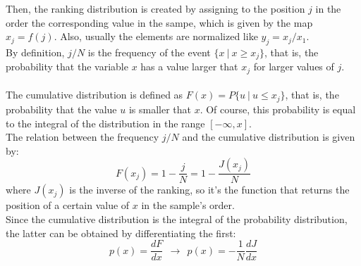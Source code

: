 Then, the ranking distribution is created by assigning to the position $j$ in the order the corresponding value in the sampe, which is given by the map $x_j = f(j)$. Also, usually the elements are normalized like $y_j = x_j/x_1$. \\ 
By definition, $j/N$ is the frequency of the event $\{x \ | \ x \geq x_j \}$, that is, the probability that the variable $x$ has a value larger that $x_j$ for larger values of $j$. \\ \\
The cumulative distribution is defined as $F(x) = P\{u \ | \ u \leq x_j\}$, that is, the probability that the value $u$ is smaller that $x$. Of course, this probability is equal to the integral of the distribution in the range $[-\infty,x]$. \\
The relation between the frequency $j/N$ and the cumulative distribution is given by:
$$
	F(x_j) = 1 - \frac{j}{N} = 1 - \frac{J(x_j)}{N}
$$
where $J(x_j)$ is the inverse of the ranking, so it's the function that returns the position of a certain value of $x$ in the sample's order. \\
Since the cumulative distribution is the integral of the probability distribution, the latter can be obtained by differentiating the first:
$$
	p(x) = \frac{dF}{dx} \ \ \longrightarrow \ \ p(x) = -\frac{1}{N} \frac{dJ}{dx}
$$
